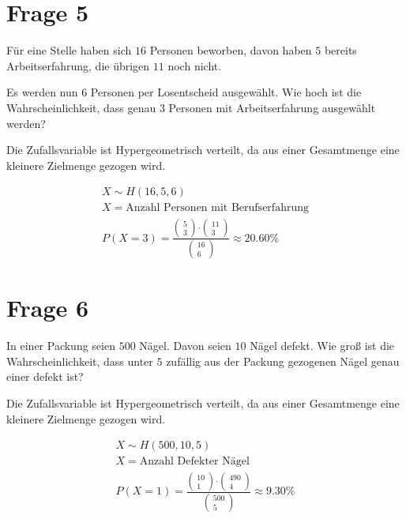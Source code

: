 \section{Frage 5}

Für eine Stelle haben sich $16$ Personen beworben, davon haben $5$ bereits Arbeitserfahrung, die übrigen $11$ noch nicht.

Es werden nun $6$ Personen per Losentscheid ausgewählt. Wie hoch ist die Wahrscheinlichkeit, dass genau $3$ Personen mit Arbeitserfahrung ausgewählt werden?

Die Zufallsvariable ist Hypergeometrisch verteilt, da aus einer Gesamtmenge eine kleinere Zielmenge gezogen wird.

\begin{align*}
    X \sim H(16, 5, 6) \\
    X = \text{Anzahl Personen mit Berufserfahrung} \\
    P(X = 3) = \frac{\begin{pmatrix}
        5 \\ 3
    \end{pmatrix} \cdot \begin{pmatrix}
        11 \\ 3
    \end{pmatrix}}{\begin{pmatrix}
        16 \\ 6
    \end{pmatrix}} \approx 20.60\%
\end{align*}

\section{Frage 6}

In einer Packung seien $500$ Nägel. Davon seien $10$ Nägel defekt. Wie groß ist die Wahrscheinlichkeit, dass unter $5$ zufällig aus der Packung gezogenen Nägel genau einer defekt ist?

Die Zufallsvariable ist Hypergeometrisch verteilt, da aus einer Gesamtmenge eine kleinere Zielmenge gezogen wird.

\begin{align*}
    X \sim H(500, 10, 5) \\
    X = \text{Anzahl Defekter Nägel} \\
    P(X = 1) = \frac{\begin{pmatrix}
        10 \\ 1
    \end{pmatrix} \cdot \begin{pmatrix}
        490 \\ 4
    \end{pmatrix}}{\begin{pmatrix}
        500 \\ 5
    \end{pmatrix}} \approx 9.30\%
\end{align*}